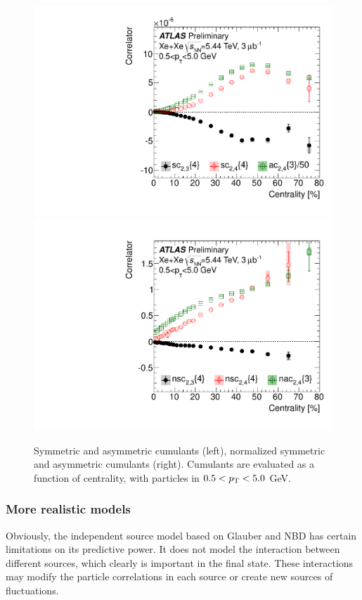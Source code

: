 \begin{figure}[H]
\centering
\includegraphics[width=.475\linewidth]{figs/chapter_centfluc/ATLAS_Xe_sc.pdf}
\includegraphics[width=.475\linewidth]{figs/chapter_centfluc/ATLAS_Xe_nsc.pdf}
\caption{Symmetric and asymmetric cumulants (left), normalized symmetric and asymmetric cumulants (right). Cumulants are evaluated as a function of centrality, with particles in $0.5<p_\text{T}<5.0$ GeV.}
\label{fig:centfluc_ATLAS_Xe_sc}
\end{figure}



\subsubsection{More realistic models}

Obviously, the independent source model based on Glauber and NBD has certain limitations on its predictive power. It does not model the interaction between different sources, which clearly is important in the final state. These interactions may modify the particle correlations in each source or create new sources of fluctuations.

